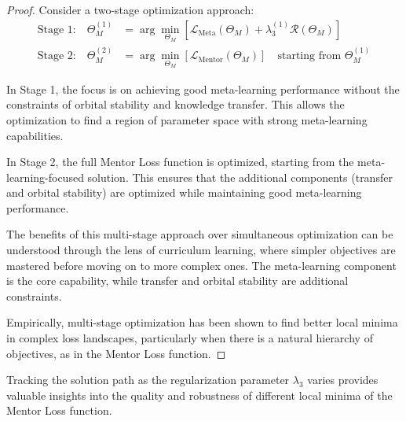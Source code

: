 \begin{proof}
Consider a two-stage optimization approach:
\begin{align}
\text{Stage 1:} \quad \Theta_M^{(1)} &= \arg\min_{\Theta_M} [\mathcal{L}_{\text{Meta}}(\Theta_M) + \lambda_3^{(1)} \mathcal{R}(\Theta_M)] \\
\text{Stage 2:} \quad \Theta_M^{(2)} &= \arg\min_{\Theta_M} [\mathcal{L}_{\text{Mentor}}(\Theta_M)] \quad \text{starting from } \Theta_M^{(1)}
\end{align}

In Stage 1, the focus is on achieving good meta-learning performance without the constraints of orbital stability and knowledge transfer. This allows the optimization to find a region of parameter space with strong meta-learning capabilities.

In Stage 2, the full Mentor Loss function is optimized, starting from the meta-learning-focused solution. This ensures that the additional components (transfer and orbital stability) are optimized while maintaining good meta-learning performance.

The benefits of this multi-stage approach over simultaneous optimization can be understood through the lens of curriculum learning, where simpler objectives are mastered before moving on to more complex ones. The meta-learning component is the core capability, while transfer and orbital stability are additional constraints.

Empirically, multi-stage optimization has been shown to find better local minima in complex loss landscapes, particularly when there is a natural hierarchy of objectives, as in the Mentor Loss function.
\end{proof}

\begin{theorem}
Tracking the solution path as the regularization parameter $\lambda_3$ varies provides valuable insights into the quality and robustness of different local minima of the Mentor Loss function.
\end{theorem}

